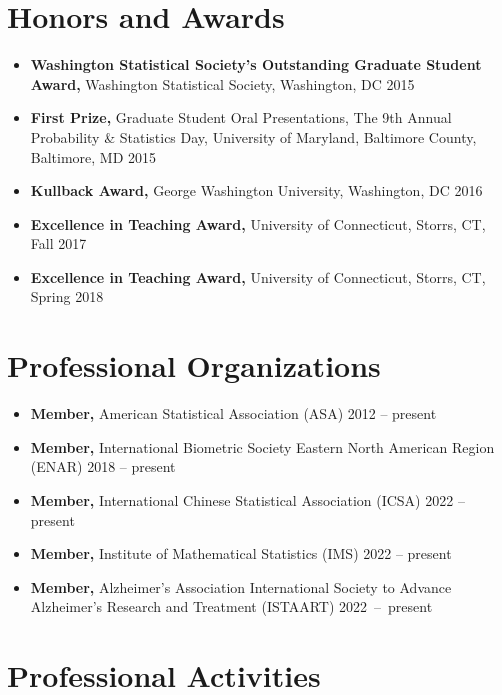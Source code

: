 \documentclass[12pt]{article}
\begin{document}
	\section*{Honors and Awards}
	\begin{itemize}
		\item {\bf Washington Statistical Society's Outstanding Graduate Student Award,} Washington Statistical Society, Washington, DC \hfill 2015
		\item {\bf First Prize,} Graduate Student Oral Presentations, The 9th Annual Probability \& Statistics Day,  University of Maryland, Baltimore County, Baltimore, MD \hfill 2015
		\item {\bf Kullback Award,} George Washington University, Washington, DC \hfill 2016
		\item {\bf Excellence in Teaching Award,} University of Connecticut, Storrs, CT, \hfill Fall 2017
		\item {\bf Excellence in Teaching Award,} University of Connecticut, Storrs, CT, \hfill Spring 2018
	\end{itemize}
		
	\section*{Professional Organizations}
	\begin{itemize}
		\item {\bf Member,} American Statistical Association (ASA) \hfill 2012 -- present
		\item {\bf Member,} International Biometric Society Eastern North American Region (ENAR) \hfill 2018 -- present
		\item {\bf Member,} International Chinese Statistical Association (ICSA) \hfill 2022 -- present
		\item {\bf Member,} Institute of Mathematical Statistics (IMS) \hfill 2022 -- present
		\item {\bf Member,} Alzheimer's Association International 
		Society to Advance Alzheimer's Research and Treatment 
		(ISTAART) \hfill \mbox{2022 -- present}
	\end{itemize}

	\section*{Professional Activities}
	
\end{document}
